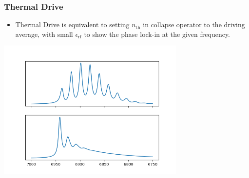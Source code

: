 \documentclass[xcolor=dvipsnames,hyperref={CJKbookmarks=true}]{beamer}
\newcommand{\rf}{\text{rf}}
\newcommand{\thm}{\text{th}}
\begin{document}
\begin{frame}[t]\frametitle{Thermal Drive}
\begin{itemize}
	\item Thermal Drive is equivalent to setting $n_{\thm}$ in collapse operator
	to the driving average, with small $\epsilon_{\rf}$ to show the phase 
	lock-in at the given frequency. 
\end{itemize}
	\centering
    \includegraphics[width=0.7\textwidth]{thermal.png}
\end{frame}
\end{document}
